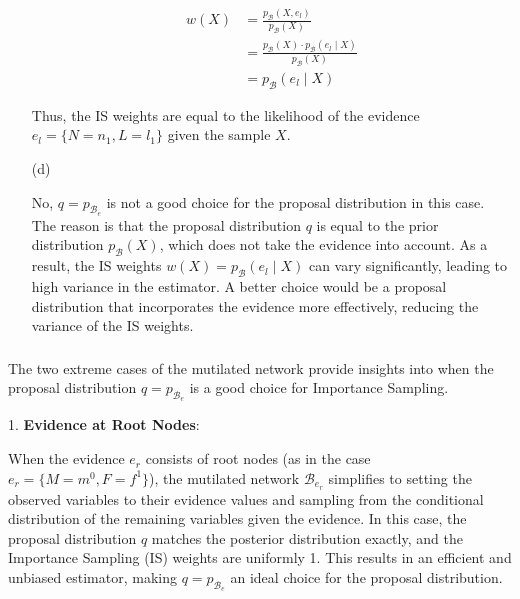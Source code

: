 \documentclass[a4 paper]{article}
\begin{document}
\begin{enumerate}
    \begin{align*}
    w(X) &= \frac{p_{\mathcal{B}}(X, e_l)}{p_{\mathcal{B}}(X)} \\
    &= \frac{p_{\mathcal{B}}(X) \cdot p_{\mathcal{B}}(e_l \mid X)}{p_{\mathcal{B}}(X)} \\
    &= p_{\mathcal{B}}(e_l \mid X)
    \end{align*}

    Thus, the IS weights are equal to the likelihood of the evidence \( e_l = \{N = n_1, L = l_1\} \) given the sample \( X \).
    
    \item[(d)] 
    
    No, \( q = p_{\mathcal{B}_e} \) is not a good choice for the proposal distribution in this case. 
    The reason is that the proposal distribution \( q \) is equal to the prior distribution \( p_{\mathcal{B}}(X) \), 
    which does not take the evidence into account. As a result, the IS weights \( w(X) = p_{\mathcal{B}}(e_l \mid X) \) 
    can vary significantly, leading to high variance in the estimator. 
    A better choice would be a proposal distribution that incorporates the evidence more effectively, reducing the variance of the IS weights.
    

\end{enumerate}

\subsubsection*{}


The two extreme cases of the mutilated network provide insights into when the proposal distribution \( q = p_{\mathcal{B}_e} \) is a good choice for Importance Sampling.

1. \textbf{Evidence at Root Nodes}:

   When the evidence \( e_r \) consists of root nodes (as in the case \( e_r = \{M = m^0, F = f^1\} \)), the mutilated network \( \mathcal{B}_{e_r} \) simplifies to setting the observed variables to their evidence values and sampling from the conditional distribution of the remaining variables given the evidence. In this case, the proposal distribution \( q \) matches the posterior distribution exactly, and the Importance Sampling (IS) weights are uniformly 1. This results in an efficient and unbiased estimator, making \( q = p_{\mathcal{B}_e} \) an ideal choice for the proposal distribution.
\end{document}
